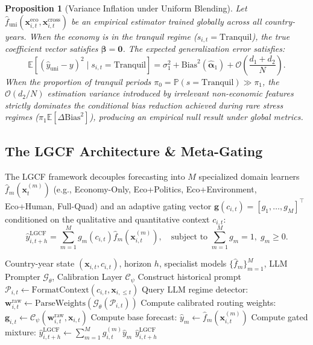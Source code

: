 \documentclass[11pt,a4paper]{article}
\newtheorem{proposition}{Proposition}
\begin{document}
\begin{proposition}[Variance Inflation under Uniform Blending]
Let $\hat{f}_{\text{uni}}(\mathbf{x}_{i,t}^{\text{eco}}, \mathbf{x}_{i,t}^{\text{cross}})$ be an empirical estimator trained globally across all country-years. When the economy is in the tranquil regime ($s_{i,t} = \text{Tranquil}$), the true coefficient vector satisfies $\boldsymbol{\beta} = \mathbf{0}$. The expected generalization error satisfies:
\begin{equation}
\mathbb{E}[(\hat{y}_{\text{uni}} - y)^2 \mid s_{i,t} = \text{Tranquil}] = \sigma_1^2 + \text{Bias}^2(\hat{\boldsymbol{\alpha}}_1) + \mathcal{O}\left(\frac{d_1 + d_2}{N}\right).
\end{equation}
When the proportion of tranquil periods $\pi_0 = \mathbb{P}(s = \text{Tranquil}) \gg \pi_1$, the $\mathcal{O}(d_2 / N)$ estimation variance introduced by irrelevant non-economic features strictly dominates the conditional bias reduction achieved during rare stress regimes ($\pi_1 \mathbb{E}[\Delta \text{Bias}^2]$), producing an empirical null result under global metrics.
\end{proposition}

\subsection{The LGCF Architecture \& Meta-Gating}
The LGCF framework decouples forecasting into $M$ specialized domain learners $\hat{f}_m(\mathbf{x}_t^{(m)})$ (e.g., Economy-Only, Eco+Politics, Eco+Environment, Eco+Human, Full-Quad) and an adaptive gating vector $\mathbf{g}(c_{i,t}) = [g_1, \dots, g_M]^\top$ conditioned on the qualitative and quantitative context $c_{i,t}$:
\begin{equation}
\hat{y}_{i, t+h}^{\text{LGCF}} = \sum_{m=1}^M g_m(c_{i,t}) \hat{f}_m(\mathbf{x}_{i,t}^{(m)}), \quad \text{subject to } \sum_{m=1}^M g_m = 1, \; g_m \ge 0.
\end{equation}

\begin{algorithm}[H]
\caption{LLM-Gated Cross-Domain Forecasting (LGCF)}\label{alg:lgcf}
\begin{algorithmic}[1]
\Require Country-year state $(\mathbf{x}_{i,t}, c_{i,t})$, horizon $h$, specialist models $\{\hat{f}_m\}_{m=1}^M$, LLM Prompter $\mathcal{G}_\theta$, Calibration Layer $\mathcal{C}_\psi$
\State Construct historical prompt $\mathcal{P}_{i,t} \leftarrow \text{FormatContext}(c_{i,t}, \mathbf{x}_{i, \le t})$ 
\State Query LLM regime detector: $\mathbf{w}_{i,t}^{\text{raw}} \leftarrow \text{ParseWeights}(\mathcal{G}_\theta(\mathcal{P}_{i,t}))$
\State Compute calibrated routing weights: $\mathbf{g}_{i,t} \leftarrow \mathcal{C}_\psi(\mathbf{w}_{i,t}^{\text{raw}}, \mathbf{x}_{i,t})$
    \State Compute base forecast: $\hat{y}_m \leftarrow \hat{f}_m(\mathbf{x}_{i,t}^{(m)})$
\EndFor
\State Compute gated mixture: $\hat{y}_{i,t+h}^{\text{LGCF}} \leftarrow \sum_{m=1}^M g_{i,t}^{(m)} \hat{y}_m$
\State \Return $\hat{y}_{i,t+h}^{\text{LGCF}}$
\end{algorithmic}
\end{algorithm}
\end{document}
